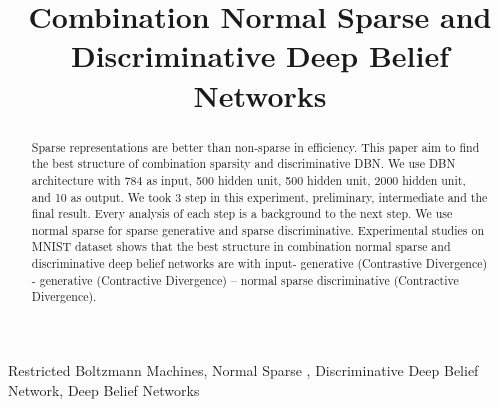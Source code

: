 \documentclass[conference]{IEEEtran}
\begin{document}
\title{Combination Normal Sparse and Discriminative Deep Belief Networks}

\author{
\and

}

\maketitle

\begin{abstract}
Sparse representations are better than non-sparse in efficiency. This paper
aim to find the best structure of combination sparsity and
discriminative DBN. We use DBN architecture with 784 as input,
500 hidden unit, 500 hidden unit, 2000 hidden unit, and 10 as
output. We took 3 step in this experiment, preliminary,
intermediate and the final result. Every analysis of each step is a
background to the next step. We use normal sparse for sparse
generative and sparse discriminative. Experimental studies on
MNIST dataset shows that the best structure in combination
normal sparse and discriminative deep belief networks are with
input- generative (Contrastive Divergence) - generative
(Contractive Divergence) – normal sparse
discriminative
(Contractive Divergence).
\end{abstract}

\begin{IEEEkeywords}
Restricted Boltzmann Machines, Normal Sparse , Discriminative Deep Belief Network, Deep Belief Networks
\end{IEEEkeywords}

\IEEEpeerreviewmaketitle
\end{document}
